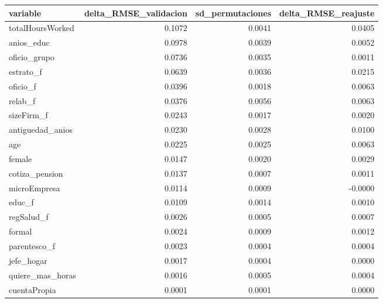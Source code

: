 \begin{tabular}{lrrr}
\toprule
variable & delta\_RMSE\_validacion & sd\_permutaciones & delta\_RMSE\_reajuste \\
\midrule
totalHoursWorked & 0.1072 & 0.0041 & 0.0405 \\
anios\_educ & 0.0978 & 0.0039 & 0.0052 \\
oficio\_grupo & 0.0736 & 0.0035 & 0.0011 \\
estrato\_f & 0.0639 & 0.0036 & 0.0215 \\
oficio\_f & 0.0396 & 0.0018 & 0.0063 \\
relab\_f & 0.0376 & 0.0056 & 0.0063 \\
sizeFirm\_f & 0.0243 & 0.0017 & 0.0020 \\
antiguedad\_anios & 0.0230 & 0.0028 & 0.0100 \\
age & 0.0225 & 0.0025 & 0.0063 \\
female & 0.0147 & 0.0020 & 0.0029 \\
cotiza\_pension & 0.0137 & 0.0007 & 0.0011 \\
microEmpresa & 0.0114 & 0.0009 & -0.0000 \\
educ\_f & 0.0109 & 0.0014 & 0.0010 \\
regSalud\_f & 0.0026 & 0.0005 & 0.0007 \\
formal & 0.0024 & 0.0009 & 0.0012 \\
parentesco\_f & 0.0023 & 0.0004 & 0.0004 \\
jefe\_hogar & 0.0017 & 0.0004 & 0.0000 \\
quiere\_mas\_horas & 0.0016 & 0.0005 & 0.0004 \\
cuentaPropia & 0.0001 & 0.0001 & 0.0000 \\
\bottomrule
\end{tabular}
